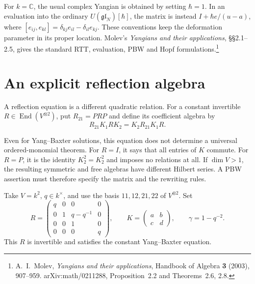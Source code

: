 For $k=\mathbb C$, the usual complex Yangian is obtained by setting $\hbar=1$.
In an evaluation into the ordinary $U(\mathfrak{gl}_N)[\hbar]$, the matrix is instead $I+\hbar e/(u-a)$, where $[e_{ij},e_{kl}]=\delta_{kj}e_{il}-\delta_{il}e_{kj}$.
These conventions keep the deformation parameter in its proper location.
Molev's \emph{Yangians and their applications}, \S\S2.1--2.5, gives the standard RTT, evaluation, PBW and Hopf formulations.\footnote{A.~I.~Molev, \emph{Yangians and their applications}, Handbook of Algebra \textbf{3} (2003), 907--959. arXiv:math/0211288, Proposition~2.2 and Theorems~2.6, 2.8.}

\section{An explicit reflection algebra}

A reflection equation is a different quadratic relation.
For a constant invertible $R\in\operatorname{End}(V^{\otimes2})$, put $R_{21}=PRP$ and define its coefficient algebra by
\[
 R_{21}K_1R K_2=K_2R_{21}K_1R.
\]

Even for Yang--Baxter solutions, this equation does not determine a universal ordered-monomial theorem.
For $R=I$, it says that all entries of $K$ commute.
For $R=P$, it is the identity $K_2^2=K_2^2$ and imposes no relations at all.
If $\dim V>1$, the resulting symmetric and free algebras have different Hilbert series.
A PBW assertion must therefore specify the matrix and the rewriting rules.

Take $V=k^2$, $q\in k^\times$, and use the basis $11,12,21,22$ of $V^{\otimes2}$.
Set
\[
 R=\begin{pmatrix}
 q&0&0&0\\
 0&1&q-q^{-1}&0\\
 0&0&1&0\\
 0&0&0&q
 \end{pmatrix},\qquad
 K=\begin{pmatrix}a&b\\c&d\end{pmatrix},\qquad \gamma=1-q^{-2}.
\]
This $R$ is invertible and satisfies the constant Yang--Baxter equation.

